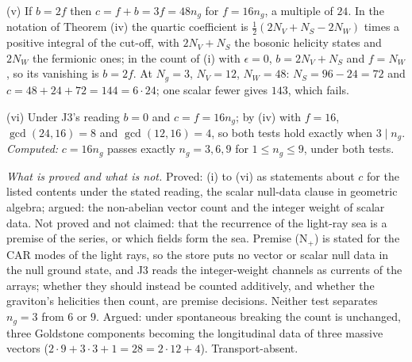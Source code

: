 (v) If $b = 2f$ then $c = f + b = 3f = 48n_{g}$ for $f = 16n_{g}$, a multiple of $24$. In the notation of Theorem (iv) the quartic coefficient is $\tfrac12(2N_{V} + N_{S} - 2N_{W})$ times a positive integral of the cut-off, with $2N_{V} + N_{S}$ the bosonic helicity states and $2N_{W}$ the fermionic ones; in the count of (i) with $\epsilon = 0$, $b = 2N_{V} + N_{S}$ and $f = N_{W}$, so its vanishing is $b = 2f$. At $N_{g} = 3$, $N_{V} = 12$, $N_{W} = 48$: $N_{S} = 96 - 24 = 72$ and $c = 48 + 24 + 72 = 144 = 6 \cdot 24$; one scalar fewer gives $143$, which fails.

(vi) Under J3's reading $b = 0$ and $c = f = 16n_{g}$; by (iv) with $f = 16$, $\gcd(24, 16) = 8$ and $\gcd(12, 16) = 4$, so both tests hold exactly when $3 \mid n_{g}$. \emph{Computed:} $c = 16n_{g}$ passes exactly $n_{g} = 3, 6, 9$ for $1 \le n_{g} \le 9$, under both tests.

\emph{What is proved and what is not.} Proved: (i) to (vi) as statements about $c$ for the listed contents under the stated reading, the scalar null-data clause in geometric algebra; argued: the non-abelian vector count and the integer weight of scalar data. Not proved and not claimed: that the recurrence of the light-ray sea is a premise of the series, or which fields form the sea. Premise (N$_{+}$) is stated for the CAR modes of the light rays, so the store puts no vector or scalar null data in the null ground state, and J3 reads the integer-weight channels as currents of the arrays; whether they should instead be counted additively, and whether the graviton's helicities then count, are premise decisions. Neither test separates $n_{g} = 3$ from $6$ or $9$. Argued: under spontaneous breaking the count is unchanged, three Goldstone components becoming the longitudinal data of three massive vectors ($2 \cdot 9 + 3 \cdot 3 + 1 = 28 = 2 \cdot 12 + 4$). Transport-absent.

